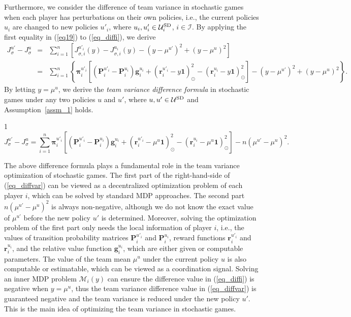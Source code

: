 \documentclass[12pt]{article}
\begin{document}
Furthermore, we consider the difference of team variance in
stochastic games when each player has perturbations on their own
policies, i.e., the current policies $u_i$ are changed to new
policies $u'_i$, where $u_i, u'_i \in \mathcal U^{\rm SD}_i$, $i \in
\mathcal I$. By applying the first equality in (\ref{eq19}) to
(\ref{eq_diffi}), we derive
\begin{eqnarray}
J^{u'}_{\sigma} - J^{u}_{\sigma} &=& \sum_{i=1}^{n}
[J^{u'_{i}}_{\sigma,i}(y) - J^{u_{i}}_{\sigma,i}(y) - (y-\mu^{u'})^2 + (y-\mu^{u})^2] \nonumber\\
&=& \sum_{i=1}^{n} \left\{ \bm \pi^{u'_i}_i[(\bm P^{u'_i}_i - \bm
P^{u_i}_i)\bm g^{u_i}_i + (\bm r^{u'_i}_i - y \bm 1)^2_{\odot} -
(\bm r^{u_i}_i - y \bm 1)^2_{\odot}] - (y-\mu^{u'})^2 + (y-\mu^u)^2
\right\}. \nonumber
\end{eqnarray}
By letting $y = \mu^u$, we derive the \emph{team variance difference
formula} in stochastic games under any two policies $u$ and $u'$,
where $u, u' \in \mathcal U^{\rm SD}$ and Assumption~\ref{assm_1}
holds.
\begin{center}
\begin{boxedminipage}{1\columnwidth}
\vspace{-10pt}
\begin{equation}\label{eq_diffvar}
J^{u'}_{\sigma} - J^{u}_{\sigma} = \sum_{i=1}^{n} \bm
\pi^{u'_i}_i[(\bm P^{u'_i}_i - \bm P^{u_i}_i)\bm g^{u_i}_i + (\bm
r^{u'_i}_i - \mu^u \bm 1)^2_{\odot} - (\bm r^{u_i}_i - \mu^u \bm
1)^2_{\odot}] - n(\mu^{u'}-\mu^{u})^2.
\end{equation}
\vspace{-15pt}
\end{boxedminipage}
\end{center}

The above difference formula plays a fundamental role in the team
variance optimization of stochastic games. The first part of the
right-hand-side of (\ref{eq_diffvar}) can be viewed as a
decentralized optimization problem of each player $i$, which can be
solved by standard MDP approaches. The second part
$n(\mu^{u'}-\mu^{u})^2$ is always non-negative, although we do not
know the exact value of $\mu^{u'}$ before the new policy $u'$ is
determined. Moreover, solving the optimization problem of the first
part only needs the local information of player $i$, i.e., the
values of transition probability matrices $\bm P^{u'_i}_i$ and $\bm
P^{u_i}_i$, reward functions $\bm r^{u'_i}_i$ and $\bm r^{u_i}_i$,
and the relative value function $\bm g^{u_i}_i$, which are either
given or computable parameters. The value of the team mean $\mu^u$
under the current policy $u$ is also computable or estimatable,
which can be viewed as a coordination signal. Solving an inner MDP
problem $\mathcal M_i(y)$ can ensure the difference value in
(\ref{eq_diffi}) is negative when $y=\mu^u$, thus the team variance
difference value in (\ref{eq_diffvar}) is guaranteed negative and
the team variance is reduced under the new policy $u'$. This is the
main idea of optimizing the team variance in stochastic games.
\end{document}
